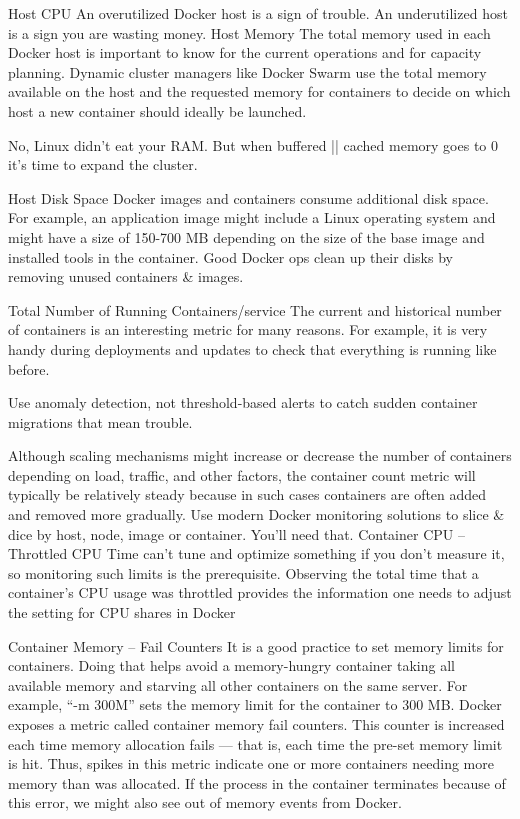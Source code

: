 Host CPU
An overutilized Docker host is a sign of trouble.
An underutilized host is a sign you are wasting money.
Host Memory
The total memory used in each Docker host is important to know for the current operations and for capacity planning. Dynamic cluster managers like Docker Swarm use the total memory available on the host and the requested memory for containers to decide on which host a new container should ideally be launched.

No, Linux didn’t eat your RAM.
But when buffered || cached memory goes to 0 it’s time to expand the cluster.

Host Disk Space
Docker images and containers consume additional disk space. For example, an application image might include a Linux operating system and might have a size of 150-700 MB depending on the size of the base image and installed tools in the container.
Good Docker ops clean up their disks by removing unused containers & images.

Total Number of Running Containers/service 
The current and historical number of containers is an interesting metric for many reasons. For example, it is very handy during deployments and updates to check that everything is running like before.

Use anomaly detection, not threshold-based alerts
to catch sudden container migrations that mean trouble.

 Although scaling mechanisms might increase or decrease the number of containers depending on load, traffic, and other factors, the container count metric will typically be relatively steady because in such cases containers are often added and removed more gradually.
Use modern Docker monitoring solutions
to slice & dice by host, node, image or container.
You’ll need that.
Container CPU – Throttled CPU Time
 can’t tune and optimize something if you don’t measure it, so monitoring such limits is the prerequisite. Observing the total time that a container’s CPU usage was throttled provides the information one needs to adjust the setting for CPU shares in Docker

 Container Memory – Fail Counters
 It is a good practice to set memory limits for containers. Doing that helps avoid a memory-hungry container taking all available memory and starving all other containers on the same server. For example, “-m 300M” sets the memory limit for the container to 300 MB. Docker exposes a metric called container memory fail counters. This counter is increased each time memory allocation fails — that is, each time the pre-set memory limit is hit. Thus, spikes in this metric indicate one or more containers needing more memory than was allocated. If the process in the container terminates because of this error, we might also see out of memory events from Docker.

